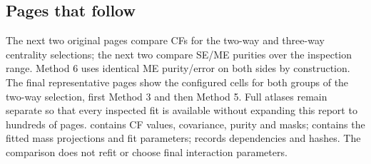 \documentclass[10pt,a4paper]{article}
\begin{document}
\subsection*{Pages that follow}
The next two original pages compare CFs for the two-way and three-way centrality selections; the next two compare SE/ME purities over the inspection range. Method 6 uses identical ME purity/error on both sides by construction. The final representative pages show the configured cells for both groups of the two-way selection, first Method 3 and then Method 5. Full atlases remain separate so that every inspected fit is available without expanding this report to hundreds of pages.
 contains CF values, covariance, purity and masks;  contains the fitted mass projections and fit parameters;  records dependencies and hashes. The comparison does not refit or choose final interaction parameters.














\end{document}
